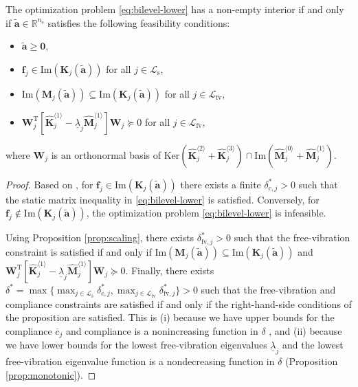 \documentclass[final,onefignum,onetabnum]{siamart220329}
\newtheorem*{proof}{Proof}%
\begin{document}
\begin{proposition}\label{th:feasibility_cond}
    The optimization problem \eqref{eq:bilevel-lower} has a non-empty interior if and only if $\tilde{\mathbf{a}} \in \mathbb{R}^{n_{\mathrm{e}}}$ satisfies {the following feasibility conditions:}
    {\begin{itemize}
    \item $\tilde{\mathbf{a}} \ge \mathbf{0}$,
    \item $\mathbf{f}_j \in \mathrm{Im}\left(\mathbf{K}_j (\tilde{\mathbf{a}})\right)$ for all $j \in \mathcal{L}_\mathrm{s}$,
    \item $\mathrm{Im}\left(\mathbf{M}_j(\tilde{\mathbf{a}})\right) \subseteq \mathrm{Im}\left(\mathbf{K}_j(\tilde{\mathbf{a}})\right)$ for all $j \in \mathcal{L}_\mathrm{fv}$,
    \item $\mathbf{W}_j^\mathrm{T}\left[\hat{\mathbf{K}}_{j}^{\langle 1\rangle} - \underline{\lambda}_j \hat{\mathbf{M}}_{j}^{\langle 1\rangle} \right]\mathbf{W}_j \succeq 0$ for all $j \in \mathcal{L}_\mathrm{fv}$,
    \end{itemize}}%
    \noindent where $\mathbf{W}_j$ is an orthonormal basis of $\mathrm{Ker}\left(\hat{\mathbf{K}}_j^{\langle 2\rangle} + \hat{\mathbf{K}}_j^{\langle 3\rangle}\right) \cap \mathrm{Im}\left(\hat{\mathbf{M}}_j^{\langle 0\rangle} + \hat{\mathbf{M}}_j^{\langle 1\rangle}\right)$.
\end{proposition}
\begin{proof}
	Based on \cite[Proposition 5]{Tyburec2023}, for $\mathbf{f}_j \in \mathrm{Im}\left(\mathbf{K}_j (\tilde{\mathbf{a}})\right)$ there exists a finite $\delta_{\mathrm{c},j}^*>0$ such that the static matrix inequality in \eqref{eq:bilevel-lower} is satisfied. Conversely, for $\mathbf{f}_j \notin \mathrm{Im}\left(\mathbf{K}_j (\tilde{\mathbf{a}})\right)$, the optimization problem \eqref{eq:bilevel-lower} is infeasible.
	
	Using Proposition \ref{prop:scaling}, there exists $\delta_{\mathrm{fv},j}^*>0$ such that the free-vibration constraint is satisfied if and only if $\mathrm{Im}\left(\mathbf{M}_j(\tilde{\mathbf{a}})\right) \subseteq \mathrm{Im}\left(\mathbf{K}_j(\tilde{\mathbf{a}})\right)$ and $\mathbf{W}_j^\mathrm{T}\left[\hat{\mathbf{K}}_{j}^{\langle 1\rangle} - \underline{\lambda}_j \hat{\mathbf{M}}_{j}^{\langle 1\rangle} \right]\mathbf{W}_j \succeq 0$.
    Finally, there exists $\delta^* = \max\{\max_{j{\in \mathcal{L}_\mathrm{s}}} \delta^*_{\mathrm{c},j}, \max_{j{\in \mathcal{L}_\mathrm{fv}}} \delta^*_{\mathrm{fv},j} \}>0$ such that the free-vibration and compliance constraints are satisfied if and only if the {right-hand-side} conditions of the proposition are satisfied. This is (i) because we have upper bounds for the compliance $\overline{c}_j$ and compliance is a nonincreasing function in $\delta$ \cite[Proposition 1]{Tyburec2023}, and (ii) because we have lower bounds for the lowest free-vibration eigenvalues $\underline{\lambda}_j$ and the lowest free-vibration eigenvalue function is a nondecreasing function in $\delta$ (Proposition \ref{prop:monotonic}).
\end{proof}
\end{document}
